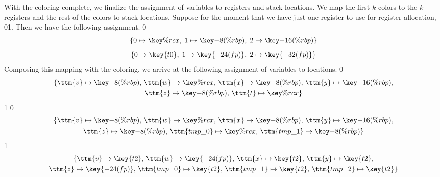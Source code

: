 \documentclass[7x10]{TimesAPriori_MIT}%
\def\racketEd{0}
\def\pythonEd{1}
\def\edition{1}
\def\xeightysixEd{0}
\def\riscvEd{1}
\def\architecture{1}
\newcommand\ifriscv[1]{\if\architecture\riscvEd{#1}\fi}
\newcommand\ifxeightsix[1]{\if\architecture\xeightysixEd{#1}\fi}
\newcommand{\pythonColor}[0]{}
\numberwithin{theorem}{chapter}
\numberwithin{definition}{chapter}
\numberwithin{equation}{chapter}
\begin{document}
With the coloring complete, we finalize the assignment of variables to
registers and stack locations. We map the first $k$ colors to the $k$
registers and the rest of the colors to stack locations.  Suppose for
the moment that we have just one register to use for register
allocation, \ifxeightsix{}\ifriscv{}. Then we have the following assignment.
\if\architecture\xeightysixEd
\[
  \{ 0 \mapsto \key{\%rcx}, \; 1 \mapsto \key{-8(\%rbp)}, \; 2 \mapsto \key{-16(\%rbp)} \}
\]
\fi
\if\riscvEd
\[
  \{ 0 \mapsto \key{t0}, \; 1 \mapsto \key{-24(fp)}, \; 2 \mapsto \key{-32(fp)} \}
\]
\fi
Composing this mapping with the coloring, we arrive at the following
assignment of variables to locations.
{\if\edition\racketEd      
\begin{gather*}
  \{ \ttm{v} \mapsto \key{-8(\%rbp)}, \,
     \ttm{w} \mapsto \key{\%rcx},  \,
     \ttm{x} \mapsto \key{-8(\%rbp)}, \,
     \ttm{y} \mapsto \key{-16(\%rbp)}, \\
     \ttm{z} \mapsto \key{-8(\%rbp)}, \,
     \ttm{t} \mapsto \key{\%rcx} \}
\end{gather*}
\fi}
{\if\edition\pythonEd\pythonColor
\if\architecture\xeightysixEd
\begin{gather*}
  \{ \ttm{v} \mapsto \key{-8(\%rbp)},  \,
  \ttm{w} \mapsto \key{\%rcx}, \,
  \ttm{x} \mapsto \key{-8(\%rbp)}, \,
  \ttm{y} \mapsto \key{-16(\%rbp)}, \\
  \ttm{z} \mapsto \key{-8(\%rbp)}, \,
  \ttm{tmp\_0} \mapsto \key{\%rcx}, \,
  \ttm{tmp\_1} \mapsto \key{-8(\%rbp)} \}
\end{gather*}
\fi
\if\architecture\riscvEd
\begin{gather*}
  \{ \ttm{v} \mapsto \key{t2},  \,
  \ttm{w} \mapsto \key{-24(fp)}, \,
  \ttm{x} \mapsto \key{t2}, \,
  \ttm{y} \mapsto \key{t2}, \\
  \ttm{z} \mapsto \key{-24(fp)}, \,
  \ttm{tmp\_0} \mapsto \key{t2}, \,
  \ttm{tmp\_1} \mapsto \key{t2}, \,
  \ttm{tmp\_2} \mapsto \key{t2} \}
\end{gather*}
\fi
\fi}
\end{document}
